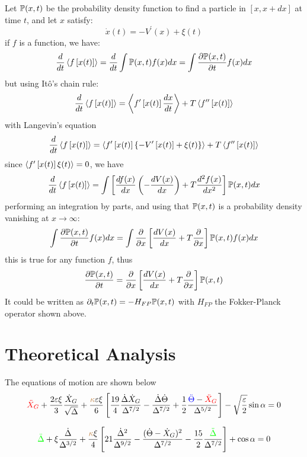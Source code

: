 \documentclass[fleqn,10pt]{InternshipReport_SI-ENS-PSL}
\begin{document}
Let $\bb{P}(x,t)$ be the probability density function to find a particle in $\left[x, x + dx\right]$ at time $t$, and let $x$ satisfy:
$$ \dot{x}(t) = -V^\prime(x) + \xi (t) $$
if $f$ is a function, we have:
$$ \frac{d}{dt} \llang f\left[ x(t) \right] \rrang = \frac{d}{dt} \int \bb{P}(x,t) f(x) dx = \int \pder[\bb{P}(x,t)]{t} f(x) dx $$
but using Itô's chain rule:
$$ \frac{d}{dt} \llang f\left[x(t)\right] \rrang = \llang f^\prime \left[ x(t) \right] \frac{dx}{dt} \rrang + T \llang f^{\prime\prime} \left[ x(t) \right] \rrang $$
with Langevin's equation
$$ \frac{d}{dt} \llang f\left[x(t)\right] \rrang = \llang f^\prime \left[ x(t) \right] \left\{ - V^\prime \left[ x(t) \right] + \xi(t) \right\} \rrang + T \llang f^{\prime\prime} \left[ x(t) \right] \rrang $$
since $\llang f^\prime \left[ x(t) \right] \xi(t) \rrang = 0$, we have
$$ \frac{d}{dt} \llang f \left[ x(t) \right] \rrang = \int \left[ \frac{df(x)}{dx} \left( - \frac{dV(x)}{dx} \right) + T \frac{d^2 f(x)}{dx^2} \right] \bb{P}(x,t) dx $$
performing an integration by parts, and using that $\bb{P}(x,t)$ is a probability density vanishing at $x\to\infty$:
$$ \int \pder[\bb{P}(x,t)]{t} f(x) dx = \int \pder{x} \left[ \frac{dV(x)}{dx} + T \pder{x} \right] \bb{P}(x,t) f(x) dx $$
this is true for any function $f$, thus
$$ \pder[\bb{P}(x,t)]{t} = \pder{x} \left[ \frac{dV(x)}{dx} + T \pder{x} \right] \bb{P}(x,t) $$
It could be written as $\partial_t \bb{P}(x,t) = - H_{FP} \bb{P}(x,t)$ with $H_{FP}$ the Fokker-Planck operator shown above.





\section*{Theoretical Analysis}


The equations of motion are shown below \cite{JFM2015}
$$ \textcolor{red}{\ddot{X}_G} + \frac{2\varepsilon \xi}{3} \frac{\dot{X}_G}{\sqrt\Delta} + \frac{\textcolor{brown}{\kappa} \varepsilon \xi}{6} \left[ \frac{19}{4} \frac{\dot\Delta \dot{X}_G}{\Delta^{7/2}} - \frac{\dot\Delta \dot\Theta}{\Delta^{7/2}} + \frac{1}{2} \frac{\textcolor{blue}{\ddot{\Theta}} - \textcolor{red}{\ddot{X}_G}}{\Delta^{5/2}} \right] - \sqrt{\frac{\varepsilon}{2}} \sin\alpha = 0 $$

$$ \textcolor{green}{\ddot{\Delta}} + \xi \frac{\dot{\Delta}}{\Delta^{3/2}} + \frac{\textcolor{brown}{\kappa} \xi}{4} \left[ 21 \frac{\dot{\Delta}^2}{\Delta^{9/2}} - \frac{(\dot\Theta - \dot{X}_G)^2}{\Delta^{7/2}} - \frac{15}{2} \frac{\textcolor{green}{\ddot{\Delta}}}{\Delta^{7/2}} \right] + \cos\alpha = 0  $$
\end{document}
